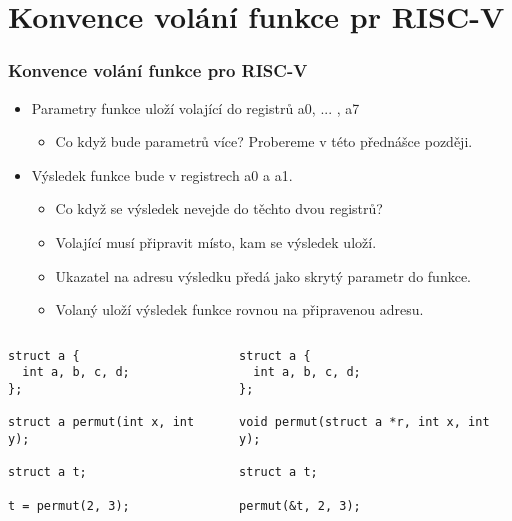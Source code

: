 \documentclass{beamer}
\begin{document}
\section{Konvence volání funkce pr RISC-V}

\begin{frame}[fragile]
\frametitle{Konvence volání funkce pro RISC-V}

\begin{itemize}
 \item Parametry funkce uloží volající do registrů a0, ... , a7
\begin{itemize}
 \item Co když bude parametrů více? Probereme v této přednášce později.
\end{itemize}
 \item Výsledek funkce bude v registrech a0 a a1.
\begin{itemize}
 \item Co když se výsledek nevejde do těchto dvou registrů?
 \item Volající musí připravit místo, kam se výsledek uloží.
 \item Ukazatel na adresu výsledku předá jako skrytý parametr do funkce.
 \item Volaný uloží výsledek funkce rovnou na připravenou adresu.
\end{itemize}
\end{itemize}

\begin{columns}
\begin{column}{0.45\textwidth}  
\begin{verbatim}
struct a {
  int a, b, c, d;
};

struct a permut(int x, int y);

struct a t;

t = permut(2, 3);
\end{verbatim}
\end{column}
\begin{column}{0.55\textwidth}  
\begin{verbatim}
struct a {
  int a, b, c, d;
};

void permut(struct a *r, int x, int y);

struct a t;

permut(&t, 2, 3);
\end{verbatim}
\end{column}
\end{columns}
\end{frame}
\end{document}

